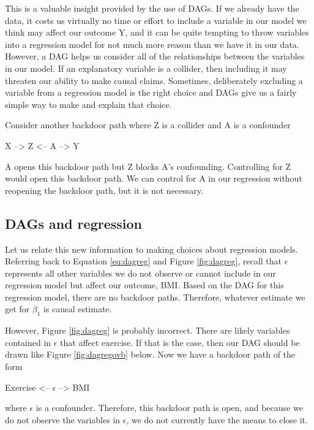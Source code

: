 \documentclass[
]{book}
\begin{document}
This is a valuable insight provided by the use of DAGs. If we already have the data, it costs us virtually no time or effort to include a variable in our model we think may affect our outcome Y, and it can be quite tempting to throw variables into a regression model for not much more reason than we have it in our data. However, a DAG helps us consider all of the relationships between the variables in our model. If an explanatory variable is a collider, then including it may threaten our ability to make causal claims. Sometimes, deliberately excluding a variable from a regression model is the right choice and DAGs give us a fairly simple way to make and explain that choice.

Consider another backdoor path where Z is a collider and A is a confounder

X --\textgreater{} Z \textless-- A --\textgreater{} Y

A opens this backdoor path but Z blocks A's confounding. Controlling for Z would open this backdoor path. We can control for A in our regression without reopening the backdoor path, but it is not necessary.

\hypertarget{dags-and-regression}{%
\subsection{DAGs and regression}\label{dags-and-regression}}

Let us relate this new information to making choices about regression models. Referring back to Equation \eqref{eq:dagreg} and Figure \ref{fig:dagreg}, recall that \(\epsilon\) represents all other variables we do not observe or cannot include in our regression model but affect our outcome, BMI. Based on the DAG for this regression model, there are no backdoor paths. Therefore, whatever estimate we get for \(\beta_1\) is causal estimate.

However, Figure \ref{fig:dagreg} is probably incorrect. There are likely variables contained in \(\epsilon\) that affect exercise. If that is the case, then our DAG should be drawn like Figure \ref{fig:dagregovb} below. Now we have a backdoor path of the form

Exercise \textless-- \(\epsilon\) --\textgreater{} BMI

where \(\epsilon\) is a confounder. Therefore, this backdoor path is open, and because we do not observe the variables in \(\epsilon\), we do not currently have the means to close it.
\end{document}
